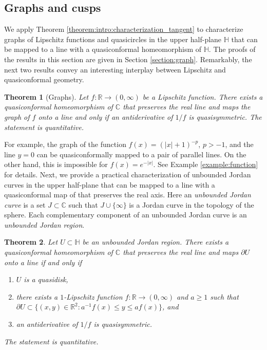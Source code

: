 \documentclass[letterpaper]{amsart}
\theoremstyle{plain}
\newtheorem{theorem}{Theorem}
\theoremstyle{definition}
\theoremstyle{remark}
\numberwithin{equation}{section}
\numberwithin{theorem}{section}
\newcommand{\R}{\mathbb R}
\newcommand{\C}{\mathbb C}
\newcommand{\UHP}{\mathbb H}
\begin{document}
\subsection{Graphs and cusps}

We apply Theorem \ref{theorem:intro:characterization_tangent} to characterize graphs of Lipschitz functions and quasicircles in the upper half-plane $\mathbb H$ that can be mapped to a line with a quasiconformal homeomorphism of $\mathbb H$. The proofs of the results in this section are given in Section \ref{section:graph}. Remarkably, the next two results convey an interesting interplay between Lipschitz and quasiconformal geometry. 

\begin{theorem}[Graphs]\label{theorem:intro:graph}
Let $f\colon \R\to (0,\infty)$ be a Lipschitz function. There exists a quasiconformal homeomorphism of $\C$ that preserves the real line and maps the graph of $f$ onto a line and only if an antiderivative of $1/f$ is quasisymmetric. The statement is quantitative.
\end{theorem}

For example, the graph of the function $f(x)=(|x|+1)^{-p}$, $p>-1$, and the line $y=0$ can be quasiconformally mapped to a pair of parallel lines. On the other hand, this is impossible for $f(x)=e^{-|x|}$. See Example \ref{example:function} for details. Next, we provide a practical characterization of unbounded Jordan curves in the upper half-plane that can be mapped to a line with a quasiconformal map of that preserves the real axis. Here an \textit{unbounded Jordan curve} is a set $J\subset \C$ such that $J\cup \{\infty\}$ is a Jordan curve in the topology of the sphere. Each complementary component of an unbounded Jordan curve is an \textit{unbounded Jordan region}.

\begin{theorem}\label{theorem:intro:graph:characterization}
Let $U\subset \UHP$ be an unbounded Jordan region. There exists a quasiconformal homeomorphism of $\C$ that preserves the real line and maps $\partial U$ onto a line if and only if
\begin{enumerate}[label=\normalfont(\arabic*)]
\item\label{theorem:graph:characterization:1} $U$ is a quasidisk,
\item\label{theorem:graph:characterization:3} there exists a $1$-Lipschitz function $f\colon \R\to (0,\infty)$ and $a\geq 1$ such that $\partial U\subset \{ (x,y)\in \R^2: a^{-1}f(x)\leq y\leq af(x)\}$, and
\item\label{theorem:graph:characterization:4} an antiderivative of $1/f$ is quasisymmetric.
\end{enumerate}
The statement is quantitative.
\end{theorem}
\end{document}
